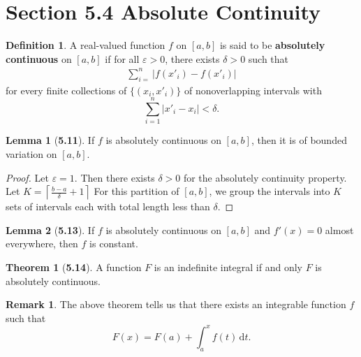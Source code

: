 \documentclass[12pt]{article}
\newcommand{\dif}{\, \mathrm{d}}
\newcommand{\ceil}[1]{\left\lceil #1 \right\rceil}
\renewcommand{\epsilon}{\varepsilon}
\theoremstyle{definition}
\newtheorem*{thm}{Theorem}
\newtheorem*{definition}{Definition}
\newtheorem*{lemma}{Lemma}
\newtheorem*{remark}{Remark}
\begin{document}
\section*{Section 5.4 Absolute Continuity}

\begin{definition}
    A real-valued function \( f \) on \( [a,b] \) is said to be \textbf{absolutely continuous} on \( [a,b ] \)
    if for all \( \epsilon > 0 \), there exists \( \delta > 0 \) such that 
        \begin{align*}
            \sum_{i=}^{n} \left| f(x'_i) - f(x'_{i}) \right|
        \end{align*}
    for every finite collections of \( \{ (x_i, x'_{i}) \} \) of nonoverlapping intervals with 
        \[
            \sum_{i=1}^{n} \left| x'_{i} - x_{i} \right| < \delta.  
        \]
\end{definition}


\begin{lemma}[\textbf{5.11}]

    If \( f \) is absolutely continuous on \( [a,b] \), then it is of bounded variation on \( [a,b] \).

        \begin{proof}
            Let \( \epsilon  = 1 \). Then there exists \( \delta > 0 \) for the absolutely continuity property. 
            Let \( \displaystyle K = \ceil{\frac{b-a}{\delta} + 1} \)
            For this partition of \( [a,b] \), we group the intervals into \( K \) sets of intervals each with total length less than \( \delta \).
        \end{proof}
\end{lemma}

\begin{lemma}[\textbf{5.13}]

    If \( f \) is absolutely continuous on \( [a,b] \) and \( f'(x) = 0 \) almost everywhere, then \( f \) is constant. 
    
\end{lemma}

\begin{thm}[\textbf{5.14}]

    A function \( F \) is an indefinite integral if and only \( F \) is absolutely continuous. 

\end{thm}

\begin{remark}
    The above theorem tells us that there exists an integrable function \( f \) such that 
        \[
            F(x) = F(a) + \int_{a}^{x} f(t) \dif t.  
        \]
\end{remark}
\end{document}
